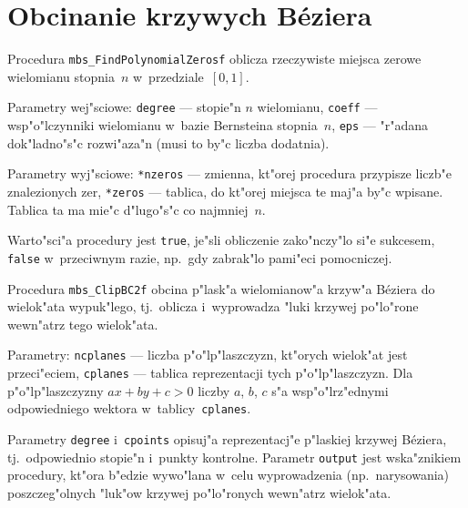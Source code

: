 \newpage
\section{Obcinanie krzywych B\'{e}ziera}

\hspace*{\parindent}Procedura \texttt{mbs\_FindPolynomialZerosf} oblicza
rzeczywiste miejsca zerowe wielomianu stopnia~$n$ w~przedziale~$[0,1]$.

Parametry wej"sciowe: \texttt{degree} --- stopie"n $n$ wielomianu,
\texttt{coeff} --- wsp"o"lczynniki wielomianu w~bazie Bernsteina stopnia~$n$,
\texttt{eps} --- "r"adana dok"ladno"s"c rozwi"aza"n (musi to by"c liczba
dodatnia).

Parametry wyj"sciowe: \texttt{*nzeros} --- zmienna, kt"orej procedura
przypisze liczb"e znalezionych zer, \texttt{*zeros} --- tablica, do kt"orej
miejsca te maj"a by"c wpisane. Tablica ta ma mie"c d"lugo"s"c co najmniej~$n$.

Warto"sci"a procedury jest \texttt{true}, je"sli obliczenie zako"nczy"lo si"e
sukcesem, \texttt{false} w~przeciwnym razie, np.\ gdy zabrak"lo pami"eci
pomocniczej.

\vspace{\bigskipamount}
Procedura \texttt{mbs\_ClipBC2f} obcina p"lask"a wielomianow"a krzyw"a
B\'{e}ziera do wielok"ata wypuk"lego, tj.\ oblicza i~wyprowadza "luki
krzywej po"lo"rone wewn"atrz tego wielok"ata.

Parametry: \texttt{ncplanes} --- liczba p"o"lp"laszczyzn, kt"orych
wielok"at jest przeci"eciem, \texttt{cplanes} --- tablica reprezentacji
tych p"o"lp"laszczyzn. Dla p"o"lp"laszczyzny $ax+by+c>0$ liczby
$a$, $b$, $c$ s"a wsp"o"lrz"ednymi odpowiedniego wektora
w~tab\-li\-cy~\texttt{cplanes}.

Parametry \texttt{degree} i~\texttt{cpoints} opisuj"a reprezentacj"e p"laskiej
krzywej B\'{e}ziera, tj.\ odpowiednio stopie"n i~punkty kontrolne.
Parametr \texttt{output} jest wska"znikiem procedury, kt"ora b"edzie wywo"lana
w~celu wyprowadzenia (np.\ narysowania) poszczeg"olnych "luk"ow krzywej
po"lo"ronych wewn"atrz wielok"ata.

